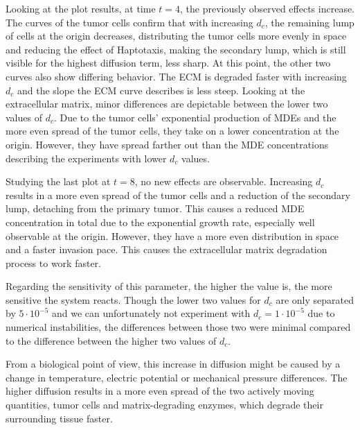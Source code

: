 Looking at the plot results, at time $t=4$, the previously observed effects increase. The curves of the tumor cells confirm that with increasing $d_c$, the remaining lump of cells at the origin decreases, distributing the tumor cells more evenly in space and reducing the effect of Haptotaxis, making the secondary lump, which is still visible for the highest diffusion term, less sharp. At this point, the other two curves also show differing behavior. The ECM is degraded faster with increasing $d_c$ and the slope the ECM curve describes is less steep. Looking at the extracellular matrix, minor differences are depictable between the lower two values of $d_c$. Due to the tumor cells' exponential production of MDEs and the more even spread of the tumor cells, they take on a lower concentration at the origin. However, they have spread farther out than the MDE concentrations describing the experiments with lower $d_c$ values.

Studying the last plot at $t=8$, no new effects are observable. Increasing $d_c$ results in a more even spread of the tumor cells and a reduction of the secondary lump, detaching from the primary tumor. This causes a reduced MDE concentration in total due to the exponential growth rate, especially well observable at the origin. However, they have a more even distribution in space and a faster invasion pace. This causes the extracellular matrix degradation process to work faster.

Regarding the sensitivity of this parameter, the higher the value is, the more sensitive the system reacts. Though the lower two values for $d_c$ are only separated by $5\cdot 10^{-5}$ and we can unfortunately not experiment with $d_c=1 \cdot 10^{-5}$ due to numerical instabilities, the differences between those two were minimal compared to the difference between the higher two values of $d_c$.

From a biological point of view, this increase in diffusion might be caused by a change in temperature, electric potential or mechanical pressure differences. The higher diffusion results in a more even spread of the two actively moving quantities, tumor cells and matrix-degrading enzymes, which degrade their surrounding tissue faster.


